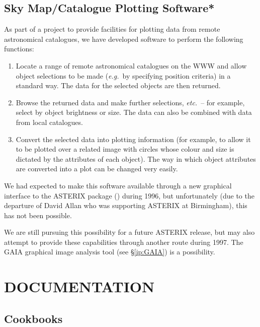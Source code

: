 \subsection{\label{xray:catalogue}Sky Map/Catalogue Plotting Software*}

As part of a project to provide facilities for plotting data from
remote astronomical catalogues, we have developed software to perform
the following functions:

\begin{enumerate}
\item Locate a range of remote astronomical catalogues on the WWW and
allow object selections to be made ({\em e.g.}\ by specifying position
criteria) in a standard way. The data for the selected objects are
then returned.

\item Browse the returned data and make further selections, {\em
etc.}\ -- for example, select by object brightness or size. The data
can also be combined with data from local catalogues.

\item Convert the selected data into plotting information (for
example, to allow it to be plotted over a related image with circles
whose colour and size is dictated by the attributes of each
object). The way in which object attributes are converted into a plot
can be changed very easily.
\end{enumerate}

We had expected to make this software available through a new
graphical interface to the ASTERIX package ()
during 1996, but unfortunately (due to the departure of David Allan
who was supporting ASTERIX at Birmingham), this has not been possible.

We are still pursuing this possibility for a future ASTERIX release,
but may also attempt to provide these capabilities through another
route during 1997. The GAIA graphical image analysis tool
(see \S\ref{ip:GAIA}) is a possibility.

\section{\label{sect:documentation}DOCUMENTATION}

\subsection{Cookbooks}

